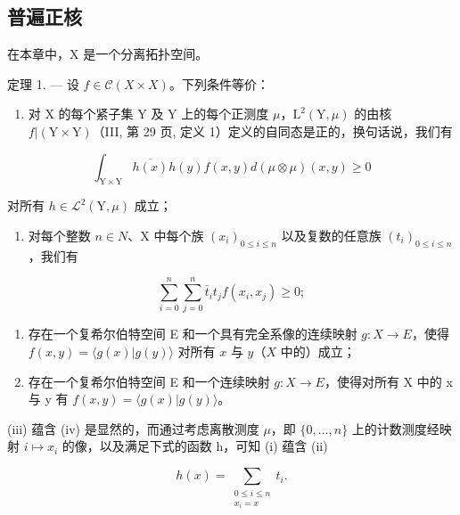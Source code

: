 \subsection{普遍正核}

在本章中，X 是一个分离拓扑空间。

定理 1. --- 设 \(f \in \mathcal{C}(X \times X)\)。下列条件等价：

\begin{enumerate}
\def\labelenumi{(\roman{enumi})}
\tightlist
\item
  对 X 的每个紧子集 Y 及 Y 上的每个正测度 \(\mu\)，\(\mathrm{L}^{2}(\mathrm{Y},\mu)\) 的由核 \(f|(\mathrm{Y}\times\mathrm{Y})\)（III, 第 29 页, 定义 1）定义的自同态是正的，换句话说，我们有
\end{enumerate}

\[
\int_ {\mathrm{Y} \times \mathrm{Y}} \overline {{h (x)}} h (y) f (x, y) d (\mu \otimes \mu) (x, y) \geqslant 0
\]

对所有 \(h \in \mathcal{L}^{2}(\mathrm{Y}, \mu)\) 成立；

\begin{enumerate}
\def\labelenumi{(\roman{enumi})}
\setcounter{enumi}{1}
\tightlist
\item
  对每个整数 \(n \in N\)、X 中每个族 \((x_{i})_{0 \leqslant i \leqslant n}\) 以及复数的任意族 \((t_{i})_{0 \leqslant i \leqslant n}\)，我们有
\end{enumerate}

\[
\sum_ {i = 0} ^ {n} \sum_ {j = 0} ^ {n} \bar {t} _ {i} t _ {j} f (x _ {i}, x _ {j}) \geqslant 0;
\]

\begin{enumerate}
\def\labelenumi{(\roman{enumi})}
\setcounter{enumi}{2}
\item
  存在一个复希尔伯特空间 E 和一个具有完全系像的连续映射 \(g \colon X \to E\)，使得 \(f(x, y) = \langle g(x) | g(y) \rangle\) 对所有 \(x\) 与 \(y\)（\(X\) 中的）成立；
\item
  存在一个复希尔伯特空间 E 和一个连续映射 \(g: X \to E\)，使得对所有 X 中的 x 与 y 有 \(f(x, y) = \langle g(x) | g(y) \rangle\)。
\end{enumerate}

(iii) 蕴含 (iv) 是显然的，而通过考虑离散测度 \(\mu\)，即 \(\{0,\ldots,n\}\) 上的计数测度经映射 \(i\mapsto x_{i}\) 的像，以及满足下式的函数 h，可知 (i) 蕴含 (ii)

\[
h(x) = \sum_{\substack{0\leqslant i\leqslant n\\ x_{i} = x}}t_{i}.
\]

